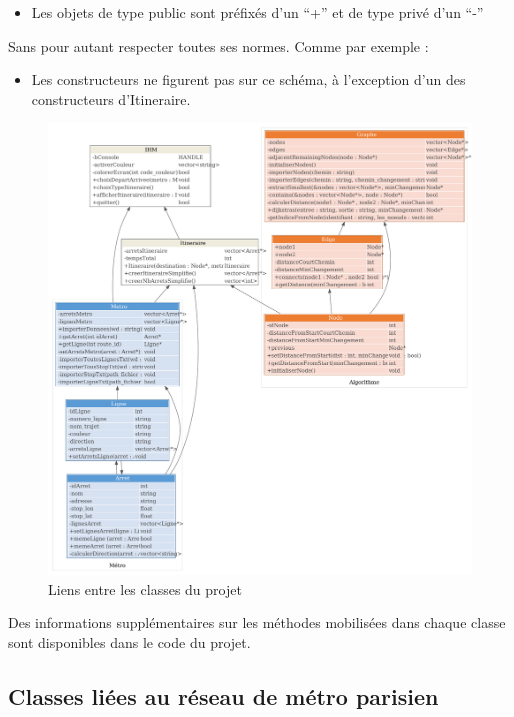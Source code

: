 \documentclass[,french]{article}
\providecommand{\tightlist}{%
  \setlength{\itemsep}{0pt}\setlength{\parskip}{0pt}}
\begin{document}
\begin{itemize}
\tightlist
\item
  Les objets de type public sont préfixés d'un ``+'' et de type privé
  d'un ``-''
\end{itemize}

Sans pour autant respecter toutes ses normes. Comme par exemple :

\begin{itemize}
\tightlist
\item
  Les constructeurs ne figurent pas sur ce schéma, à l'exception d'un
  des constructeurs d'Itineraire.
\end{itemize}

\begin{figure}
\centering
\includegraphics{img/Diagramme_classes/diagramme_classes.pdf}
\caption{Liens entre les classes du projet\label{fig:diag_classes}}
\end{figure}

Des informations supplémentaires sur les méthodes mobilisées dans chaque
classe sont disponibles dans le code du projet.

\hypertarget{classes-liuxe9es-au-ruxe9seau-de-muxe9tro-parisien}{%
\subsection{Classes liées au réseau de métro
parisien}\label{classes-liuxe9es-au-ruxe9seau-de-muxe9tro-parisien}}
\end{document}
